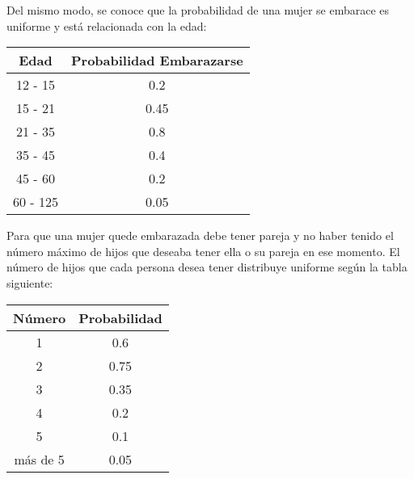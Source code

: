 \documentclass{article}
\begin{document}
            Del mismo modo, se conoce que la probabilidad de una mujer se embarace
            es uniforme y está relacionada con la edad:


            \begin{table}[h!]
                \begin{center}
                \begin{tabular}{| c | c |}
                \hline
                Edad & Probabilidad Embarazarse \\ \hline
                12 - 15  &  0.2 \\ \hline
                15 - 21  &  0.45 \\ \hline
                21 - 35  &  0.8 \\ \hline
                35 - 45  &  0.4 \\ \hline
                45 - 60  &  0.2 \\ \hline
                60 - 125  &  0.05 \\ \hline
                \end{tabular}
                \end{center}
            \end{table}

            \newpage
            Para que una mujer quede embarazada debe tener pareja y no haber tenido
            el número máximo de hijos que deseaba tener ella o su pareja en ese momento.
            El número de hijos que cada persona desea tener distribuye uniforme según la
            tabla siguiente:

            \begin{table}[h!]
                \begin{center}
                \begin{tabular}{| c | c |}
                \hline
                Número & Probabilidad \\ \hline
                1  &  0.6 \\ \hline
                2  &  0.75 \\ \hline
                3  &  0.35 \\ \hline
                4  &  0.2 \\ \hline
                5  &  0.1 \\ \hline
                más de 5  &  0.05 \\ \hline
                \end{tabular}
                \end{center}
            \end{table}
\end{document}
